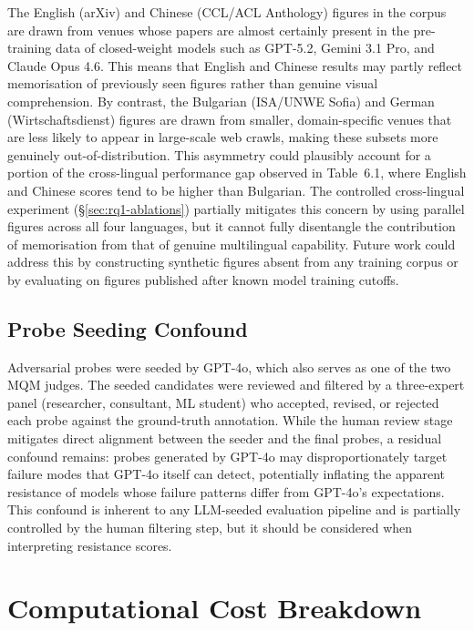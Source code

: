 The English (arXiv) and Chinese (CCL/ACL Anthology) figures in the corpus are drawn from venues whose papers are almost certainly present in the pre-training data of closed-weight models such as GPT-5.2, Gemini 3.1 Pro, and Claude Opus 4.6. This means that English and Chinese results may partly reflect memorisation of previously seen figures rather than genuine visual comprehension. By contrast, the Bulgarian (ISA/UNWE Sofia) and German (Wirtschaftsdienst) figures are drawn from smaller, domain-specific venues that are less likely to appear in large-scale web crawls, making these subsets more genuinely out-of-distribution.
This asymmetry could plausibly account for a portion of the cross-lingual performance gap observed in Table~6.1, where English and Chinese scores tend to be higher than Bulgarian. The controlled cross-lingual experiment (\S\ref{sec:rq1-ablations}) partially mitigates this concern by using parallel figures across all four languages, but it cannot fully disentangle the contribution of memorisation from that of genuine multilingual capability. Future work could address this by constructing synthetic figures absent from any training corpus or by evaluating on figures published after known model training cutoffs.

\section{Probe Seeding Confound}

Adversarial probes were seeded by GPT-4o, which also serves as one of the two MQM judges. The seeded candidates were reviewed and filtered by a three-expert panel (researcher, consultant, ML student) who accepted, revised, or rejected each probe against the ground-truth annotation. While the human review stage mitigates direct alignment between the seeder and the final probes, a residual confound remains: probes generated by GPT-4o may disproportionately target failure modes that GPT-4o itself can detect, potentially inflating the apparent resistance of models whose failure patterns differ from GPT-4o's expectations. This confound is inherent to any LLM-seeded evaluation pipeline and is partially controlled by the human filtering step, but it should be considered when interpreting resistance scores.

\chapter{Computational Cost Breakdown}
\label{app:cost-breakdown}

